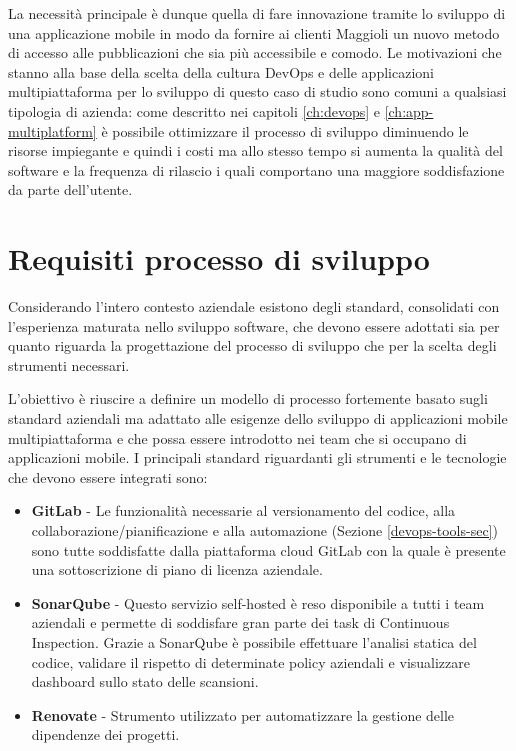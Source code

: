 La necessità principale è dunque quella di fare innovazione tramite lo sviluppo di una applicazione mobile in modo da fornire ai clienti Maggioli un nuovo metodo di accesso alle pubblicazioni che sia più accessibile e comodo. Le motivazioni che stanno alla base della scelta della cultura DevOps e delle applicazioni multipiattaforma per lo sviluppo di questo caso di studio sono comuni a qualsiasi tipologia di azienda: come descritto nei capitoli \ref{ch:devops} e \ref{ch:app-multiplatform} è possibile ottimizzare il processo di sviluppo diminuendo le risorse impiegante e quindi i costi ma allo stesso tempo si aumenta la qualità del software e la frequenza di rilascio i quali comportano una maggiore soddisfazione da parte dell'utente.

\section{Requisiti processo di sviluppo}

Considerando l'intero contesto aziendale esistono degli standard, consolidati con l'esperienza maturata nello sviluppo software, che devono essere adottati sia per quanto riguarda la progettazione del processo di sviluppo che per la scelta degli strumenti necessari. 

L'obiettivo è riuscire a definire un modello di processo fortemente basato sugli standard aziendali ma adattato alle esigenze dello sviluppo di applicazioni mobile multipiattaforma e che possa essere introdotto nei team che si occupano di applicazioni mobile. I principali standard riguardanti gli strumenti e le tecnologie che devono essere integrati sono:
\begin{itemize}
    \item \textbf{GitLab} - Le funzionalità necessarie al versionamento del codice, alla collaborazione/pianificazione e alla automazione (Sezione \ref{devops-tools-sec}) sono tutte soddisfatte dalla piattaforma cloud GitLab con la quale è presente una sottoscrizione di piano di licenza aziendale.
    \item \textbf{SonarQube} - Questo servizio self-hosted è reso disponibile a tutti i team aziendali e permette di soddisfare gran parte dei task di Continuous Inspection. Grazie a SonarQube è possibile effettuare l'analisi statica del codice, validare il rispetto di determinate policy aziendali e visualizzare dashboard sullo stato delle scansioni.
    \item \textbf{Renovate} - Strumento utilizzato per automatizzare la gestione delle dipendenze dei progetti. 
\end{itemize}

